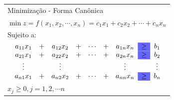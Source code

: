 \documentclass{beamer}
\begin{document}
\begin{frame}
{\begin{table}
\begin{tabular}{l}
				\cellcolor{blue!60}Minimização - Forma Canônica \\
				$\min z = f(x_1, x_2, \cdots, x_n) = c_1x_1 + c_2x_2 + \cdots + c_nx_n$ \\
				Sujeito a: \\
				$
					\begin{matrix}
						& a_{11}x_1 & + & a_{12}x_2 & + & \cdots & + & a_{1n}x_n & \cellcolor{blue!60} \ge & b_1 \\
						& a_{21}x_1 & + & a_{22}x_2 & + & \cdots & + & a_{2n}x_n & \cellcolor{blue!60} \ge & b_2 \\
						& \vdots    &   & \vdots    &   &        &   & \vdots    &     & \vdots \\	
						& a_{n1}x_1 & + & a_{n2}x_2 & + & \cdots & + & a_{nn}x_n & \cellcolor{blue!60} \ge & b_n \\
					\end{matrix}
				$ \\
				$ x_j \ge 0, j = 1, 2, \cdots n $ \\
			\end{tabular}
		\end{table}
	}
\end{frame}
\end{document}
